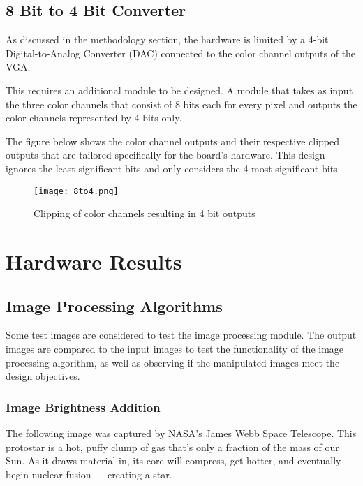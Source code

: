 \subsection{8 Bit to 4 Bit Converter}
\par As discussed in the methodology section, the hardware is limited by a 4-bit Digital-to-Analog Converter (DAC) connected to the color channel outputs of the VGA. \newline
\par This requires an additional module to be designed. A module that takes as input the three color channels that consist of 8 bits each for every pixel and outputs the color channels represented by 4 bits only.  \newline
\par The figure below shows the color channel outputs and their respective clipped outputs that are tailored specifically for the board's hardware. This design ignores the least significant bits and only considers the 4 most significant bits.  \newline

\begin{figure}[H]
	\centering
	\texttt{[image: 8to4.png]}
	\caption{ Clipping of color channels resulting in 4 bit outputs }
	\label{fig:eightfourconv}  
\end{figure}

\section{Hardware Results}

\subsection{Image Processing Algorithms}
\par Some test images are considered to test the image processing module. The output images are compared to the input images to test the functionality of the image processing algorithm, as well as observing if the manipulated images meet the design objectives. \newline

\subsubsection{Image Brightness Addition}
\par The following image was captured by NASA's James Webb Space Telescope. This protostar is a hot, puffy clump of gas that’s only a fraction of the mass of our Sun. As it draws material in, its core will compress, get hotter, and eventually begin nuclear fusion — creating a star. \newline

